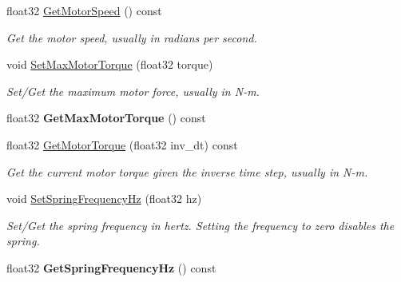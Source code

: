 \begin{DoxyCompactItemize}
float32 \hyperlink{classb2_wheel_joint_a47774ba5dfc1a6a5f15bcc651eea8127}{Get\+Motor\+Speed} () const
\begin{DoxyCompactList}\small\item\em Get the motor speed, usually in radians per second. \end{DoxyCompactList}\item 
\mbox{\label{classb2_wheel_joint_a8aae3cd624ec9d48fc86c325c4595edc}} 
void \hyperlink{classb2_wheel_joint_a8aae3cd624ec9d48fc86c325c4595edc}{Set\+Max\+Motor\+Torque} (float32 torque)
\begin{DoxyCompactList}\small\item\em Set/\+Get the maximum motor force, usually in N-\/m. \end{DoxyCompactList}\item 
\mbox{\label{classb2_wheel_joint_a8e7dc36e5c59760f2807886d0acd514e}} 
float32 {\bfseries Get\+Max\+Motor\+Torque} () const
\item 
\mbox{\label{classb2_wheel_joint_a635497eba904925e06fd5316ddec4539}} 
float32 \hyperlink{classb2_wheel_joint_a635497eba904925e06fd5316ddec4539}{Get\+Motor\+Torque} (float32 inv\+\_\+dt) const
\begin{DoxyCompactList}\small\item\em Get the current motor torque given the inverse time step, usually in N-\/m. \end{DoxyCompactList}\item 
\mbox{\label{classb2_wheel_joint_af9f8fada5cb30f83aa2fbf486e9d347b}} 
void \hyperlink{classb2_wheel_joint_af9f8fada5cb30f83aa2fbf486e9d347b}{Set\+Spring\+Frequency\+Hz} (float32 hz)
\begin{DoxyCompactList}\small\item\em Set/\+Get the spring frequency in hertz. Setting the frequency to zero disables the spring. \end{DoxyCompactList}\item 
\mbox{\label{classb2_wheel_joint_a3a22add79f238b4243407956b031c9f4}} 
float32 {\bfseries Get\+Spring\+Frequency\+Hz} () const
\item 
\mbox{\label{classb2_wheel_joint_a39b123ac045c8ec93faa65746e6655dc}} 

\end{DoxyCompactItemize}
